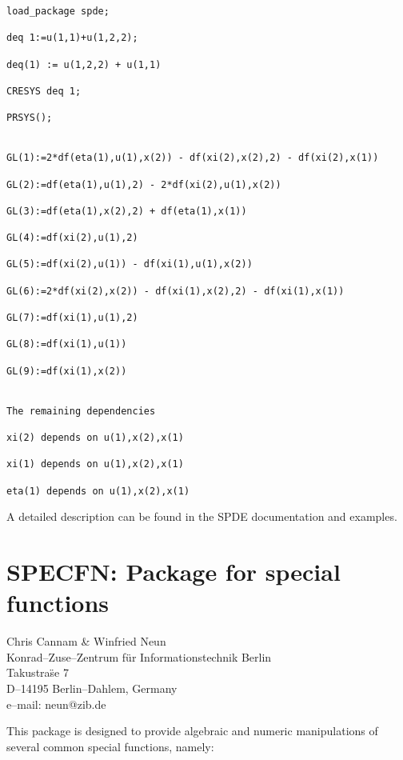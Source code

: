 \documentclass[11pt,letterpaper]{book}
\makeatletter
\newcommand{\underscore}{\_}
\newcommand{\ttindex}[1]{{\renewcommand{\_}{\protect\underscore}%
                          \index{#1@{\tt #1}}}}
\makeatother
\begin{document}
{\small\begin{verbatim}
load_package spde;

deq 1:=u(1,1)+u(1,2,2);

deq(1) := u(1,2,2) + u(1,1)

CRESYS deq 1;

PRSYS();


GL(1):=2*df(eta(1),u(1),x(2)) - df(xi(2),x(2),2) - df(xi(2),x(1))

GL(2):=df(eta(1),u(1),2) - 2*df(xi(2),u(1),x(2))

GL(3):=df(eta(1),x(2),2) + df(eta(1),x(1))

GL(4):=df(xi(2),u(1),2)

GL(5):=df(xi(2),u(1)) - df(xi(1),u(1),x(2))

GL(6):=2*df(xi(2),x(2)) - df(xi(1),x(2),2) - df(xi(1),x(1))

GL(7):=df(xi(1),u(1),2)

GL(8):=df(xi(1),u(1))

GL(9):=df(xi(1),x(2))


The remaining dependencies

xi(2) depends on u(1),x(2),x(1)

xi(1) depends on u(1),x(2),x(1)

eta(1) depends on u(1),x(2),x(1)
\end{verbatim}}

A detailed description can be found in the SPDE documentation and
examples.

\chapter{SPECFN: Package for special functions}
\label{SPECFN}

{\footnotesize
\begin{center}
Chris Cannam \& Winfried Neun \\
Konrad--Zuse--Zentrum f\"ur Informationstechnik Berlin \\
Takustra\"se 7 \\
D--14195 Berlin--Dahlem, Germany \\[0.05in]
e--mail: neun@zib.de
\end{center}
}
\ttindex{SPECFN}

This package is designed to provide algebraic and numeric manipulations of
several common special functions, namely:
\end{document}
